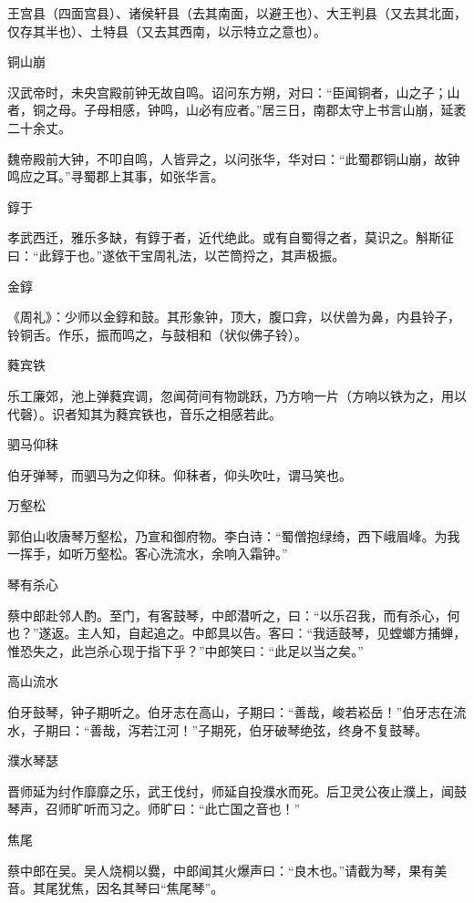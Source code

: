 \documentclass[a4paper,12pt,UTF8,twoside]{ctexbook}
\begin{document}
    王宫县（四面宫县）、诸侯轩县（去其南面，以避王也）、大王判县（又去其北面，仅存其半也）、土特县（又去其西南，以示特立之意也）。
    
    铜山崩
    
    汉武帝时，未央宫殿前钟无故自鸣。诏问东方朔，对曰：“臣闻铜者，山之子；山者，铜之母。子母相感，钟鸣，山必有应者。”居三日，南郡太守上书言山崩，延袤二十余丈。
    
    魏帝殿前大钟，不叩自鸣，人皆异之，以问张华，华对曰：“此蜀郡铜山崩，故钟鸣应之耳。”寻蜀郡上其事，如张华言。
    
    錞于
    
    孝武西迁，雅乐多缺，有錞于者，近代绝此。或有自蜀得之者，莫识之。斛斯征曰：“此錞于也。”遂依干宝周礼法，以芒筒捋之，其声极振。
    
    金錞
    
    《周礼》：少师以金錞和鼓。其形象钟，顶大，腹口弇，以伏兽为鼻，内县铃子，铃铜舌。作乐，振而鸣之，与鼓相和（状似佛子铃）。
    
    蕤宾铁
    
    乐工廉郊，池上弹蕤宾调，忽闻荷间有物跳跃，乃方响一片（方响以铁为之，用以代磬）。识者知其为蕤宾铁也，音乐之相感若此。
    
    驷马仰秣
    
    伯牙弹琴，而驷马为之仰秣。仰秣者，仰头吹吐，谓马笑也。
    
    万壑松
    
    郭伯山收唐琴万壑松，乃宣和御府物。李白诗：“蜀僧抱绿绮，西下峨眉峰。为我一挥手，如听万壑松。客心洗流水，余响入霜钟。”
    
    琴有杀心
    
    蔡中郎赴邻人酌。至门，有客鼓琴，中郎潜听之，曰：“以乐召我，而有杀心，何也？”遂返。主人知，自起追之。中郎具以告。客曰：“我适鼓琴，见螳螂方捕蝉，惟恐失之，此岂杀心现于指下乎？”中郎笑曰：“此足以当之矣。”
    
    高山流水
    
    伯牙鼓琴，钟子期听之。伯牙志在高山，子期曰：“善哉，峻若崧岳！”伯牙志在流水，子期曰：“善哉，泻若江河！”子期死，伯牙破琴绝弦，终身不复鼓琴。
    
    濮水琴瑟
    
    晋师延为纣作靡靡之乐，武王伐纣，师延自投濮水而死。后卫灵公夜止濮上，闻鼓琴声，召师旷听而习之。师旷曰：“此亡国之音也！”
    
    焦尾
    
    蔡中郎在吴。吴人烧桐以爨，中郎闻其火爆声曰：“良木也。”请截为琴，果有美音。其尾犹焦，因名其琴曰“焦尾琴”。
    
\end{document}
